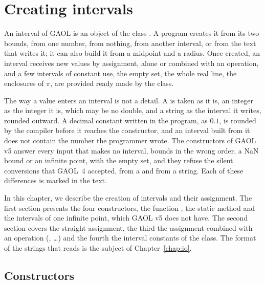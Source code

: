 \documentclass[12pt,a4paper,twoside,openright]{book}
\begin{document}
\chapter{Creating intervals}\label{chap:creation}

An interval of GAOL is an object of the class . A program
creates it from its two bounds, from one number, from nothing, from another
interval, or from the text that writes it; it can also build it from a
midpoint and a radius. Once created, an interval receives new values by
assignment, alone or combined with an operation, and a few intervals of
constant use, the empty set, the whole real line, the enclosures of $\pi$,
are provided ready made by the class.

\medskip
The way a value enters an interval is not a detail. A  is taken
as it is, an integer as the integer it is, which may be no double, and a
string as the interval it writes, rounded outward. A decimal constant written
in the program, as $0.1$, is rounded by the compiler before it reaches the
constructor, and an interval built from it does not contain the number the
programmer wrote. The constructors of GAOL v5 answer every input that makes
no interval, bounds in the wrong order, a NaN bound or an infinite point, with
the empty set, and they refuse the silent conversions that GAOL~4 accepted,
from a  and from a string. Each of these differences is marked
in the text.

\medskip
In this chapter, we describe the creation of intervals and their assignment.
The first section presents the four constructors, the function
, the static method  and the intervals
of one infinite point, which GAOL v5 does not have. The second section covers
the straight assignment, the third the assignment combined with an operation
(\code{+=}, \code{\&=}\ldots) and the fourth the interval constants of the
class. The format of the strings that  reads is the
subject of Chapter~\ref{chap:io}.

\section{Constructors}\label{sec:constructors}
%
\end{document}
